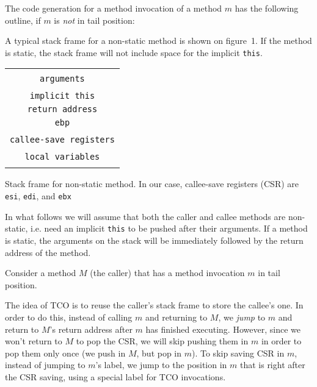 \documentclass{tufte-handout}
\begin{document}
The code generation for a method invocation of a method $m$ has the following outline, if $m$ is \textit{not} in tail position:


A typical stack frame for a non-static method is shown on figure~1. If the method is static, the stack frame will not include space for the implicit \verb'this'. 

\begin{marginfigure}
\begin{tabular}{|c|}
\\
\hline
\\
\texttt{arguments}\\
\\
\hline
\texttt{implicit this}\\
\hline
\texttt{return address}\\
\hline
\texttt{ebp}\\
\hline
\\
\texttt{callee-save registers}\\
\\
\hline
\texttt{local variables}\\
\hline
\\
\end{tabular}
\caption{Stack frame for non-static method. In our case, callee-save registers (CSR) are \texttt{esi}, \texttt{edi}, and \texttt{ebx}}
\end{marginfigure}



In what follows we will assume that both the caller and callee methods are non-static, i.e. need an implicit \verb'this' to be pushed after their arguments. If a method is static, the arguments on the stack will be immediately followed by the return address of the method. 

Consider a method $M$ (the caller) that has a method invocation $m$ in tail position. 

The idea of TCO is to reuse the caller's stack frame to store the callee's one. In order to do this, instead of calling $m$ and returning to $M$, we \textit{jump} to $m$ and return to $M$'s return address after $m$ has finished executing. However, since we won't return to $M$ to pop the CSR, we will skip pushing them in $m$ in order to pop them only once (we push in $M$, but pop in $m$). To skip saving CSR in $m$, instead of jumping to $m$'s label, we jump to the position in $m$ that is right after the CSR saving, using a special label for TCO invocations.
\end{document}
